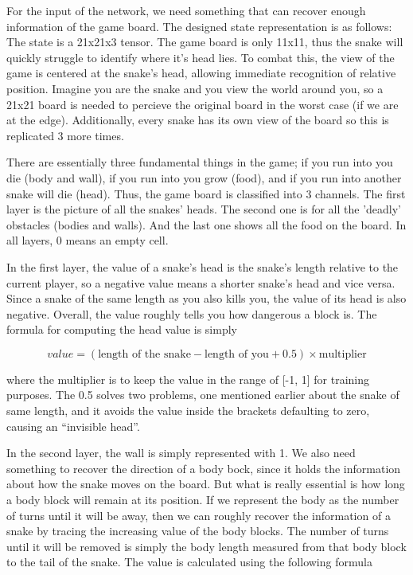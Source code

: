 ﻿\documentclass{article}
\begin{document}
\FloatBarrier

For the input of the network, we need something that can recover enough
information of the game board. The designed state representation is as
follows: The state is a 21x21x3 tensor. The game board is only 11x11, thus the
snake will quickly struggle to identify where it's head lies. To combat this,
the view of the game is centered at the snake’s head, allowing immediate
recognition of relative position. Imagine you are the snake and you view the
world around you, so a 21x21 board is needed to percieve the original board in
the worst case (if we are at the edge). Additionally, every snake has
its own view of the board so this is replicated 3 more times.

There are essentially three fundamental things in the game; if you run into you
die (body and wall), if you run into you grow (food), and if you run into
another snake will die (head). Thus, the game board is classified into 3
channels. The first layer is the picture of all the snakes’ heads. The second
one is for all the 'deadly' obstacles (bodies and walls). And the last one shows
all the food on the board. In all layers, 0 means an empty cell.

In the first layer, the value of a snake’s head is the snake’s length relative
to the current player, so a negative value means a shorter snake’s head and vice
versa. Since a snake of the same length as you also kills you, the value of its
head is also negative. Overall, the value roughly tells you how dangerous a
block is. The formula for computing the head value is simply

\begin{equation}
  value = (\text{length of the snake}-\text{length of you}+0.5) \times \text{multiplier}
\end{equation}

where the multiplier is to keep the value in the range of [-1, 1] for training
purposes. The 0.5 solves two problems, one mentioned earlier about the snake of
same length, and it avoids the value inside the brackets defaulting to zero, causing an
“invisible head”.

In the second layer, the wall is simply represented with 1. We also need
something to recover the direction of a body bock, since it holds the
information about how the snake moves on the board. But what is really essential
is how long a body block will remain at its position. If we represent the body
as the number of turns until it will be away, then we can roughly recover the
information of a snake by tracing the increasing value of the body blocks. The
number of turns until it will be removed is simply the body length measured from
that body block to the tail of the snake. The value is calculated using the
following formula
\end{document}
